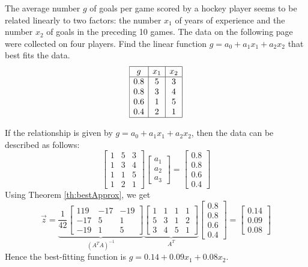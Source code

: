 \documentclass{ximera}
\begin{document}
\begin{example}\label{ex:leastSquares3}
The average number $g$ of goals per game scored by a hockey player seems to be related linearly to
two factors: the number $x_1$ of years of experience and the number $x_2$ of goals in the preceding 10
games. The data on the following page were collected on four players. Find the linear function $g=a_0+a_1x_1+a_2x_2$ that best fits the data.
$$\begin{array}{|c|c|c|} 
 \hline g&x_1&x_2\\ \hline 0.8&5&3\\  0.8&3&4\\
 0.6 &1&5\\
 0.4 &2&1\\
 \hline 
 \end{array}$$

\begin{explanation}
    If the relationship is given by $g=a_0+a_1x_1+a_2x_2$, then the data can be described as follows:
    $$\begin{bmatrix}1&5&3\\1&3&4\\1&1&5\\1&2&1\end{bmatrix}\begin{bmatrix}a_1\\a_2\\a_3\end{bmatrix}=\begin{bmatrix}0.8\\0.8\\0.6\\0.4\end{bmatrix}$$
    Using Theorem \ref{th:bestApprox}, we get
    $$\vec{z}=\underbrace{\frac{1}{42}\begin{bmatrix}
        119&-17&-19\\-17&5&1\\-19&1&5
    \end{bmatrix}}_{\left(A^TA\right)^{-1}}\underbrace{\begin{bmatrix}
        1&1&1&1\\5&3&1&2\\3&4&5&1
    \end{bmatrix}}_{A^T}\begin{bmatrix}
        0.8\\0.8\\0.6\\0.4
    \end{bmatrix}=\begin{bmatrix}
        0.14\\0.09\\0.08
    \end{bmatrix}$$
    Hence the best-fitting function is $g=0.14+0.09x_1+0.08x_2$.  
\end{explanation}    
\end{example}
\end{document}

